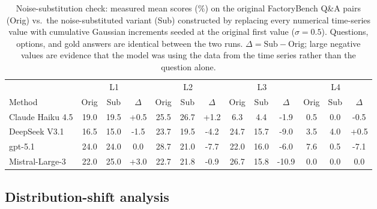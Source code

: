 \documentclass{article}
\begin{document}
\begin{table}[htbp]
    \centering
    \caption{Noise-substitution check: measured mean scores (\%) on the original FactoryBench Q\&A pairs (Orig) vs.\ the noise-substituted variant (Sub) constructed by replacing every numerical time-series value with cumulative Gaussian increments seeded at the original first value ($\sigma=0.5$). Questions, options, and gold answers are identical between the two runs. $\Delta = \text{Sub} - \text{Orig}$; large negative values are evidence that the model was using the data from the time series rather than the question alone.}
    \label{tab:noise_substitution}
    \scriptsize
    \begin{tabular}{@{}l ccc ccc ccc ccc@{}}
        \toprule
                         & \multicolumn{3}{c}{L1} & \multicolumn{3}{c}{L2} & \multicolumn{3}{c}{L3} & \multicolumn{3}{c}{L4}                                                                    \\
        \cmidrule(lr){2-4}\cmidrule(lr){5-7}\cmidrule(lr){8-10}\cmidrule(lr){11-13}
        Method           & Orig                   & Sub                    & $\Delta$               & Orig                   & Sub  & $\Delta$ & Orig & Sub  & $\Delta$ & Orig & Sub & $\Delta$ \\
        \midrule
        Claude Haiku 4.5 & 19.0                   & 19.5                   & +0.5                   & 25.5                   & 26.7 & +1.2     & 6.3  & 4.4  & -1.9     & 0.5  & 0.0 & -0.5     \\
        DeepSeek V3.1    & 16.5                   & 15.0                   & -1.5                   & 23.7                   & 19.5 & -4.2     & 24.7 & 15.7 & -9.0     & 3.5  & 4.0 & +0.5     \\
        gpt-5.1          & 24.0                   & 24.0                   & 0.0                    & 28.7                   & 21.0 & -7.7     & 22.0 & 16.0 & -6.0     & 7.6  & 0.5 & -7.1     \\
        Mistral-Large-3  & 22.0                   & 25.0                   & +3.0                   & 22.7                   & 21.8 & -0.9     & 26.7 & 15.8 & -10.9    & 0.0  & 0.0 & 0.0      \\
        \bottomrule
    \end{tabular}
\end{table}

\subsection{Distribution-shift analysis}
\label{app:arm_disturbance}
\end{document}
